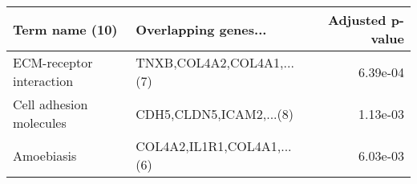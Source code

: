 \begin{tabular}{llr}
\toprule
          Term name (10) &       Overlapping genes... &  Adjusted p-value \\
\midrule
ECM-receptor interaction &  TNXB,COL4A2,COL4A1,...(7) &          6.39e-04 \\
 Cell adhesion molecules &    CDH5,CLDN5,ICAM2,...(8) &          1.13e-03 \\
              Amoebiasis & COL4A2,IL1R1,COL4A1,...(6) &          6.03e-03 \\
\bottomrule
\end{tabular}
